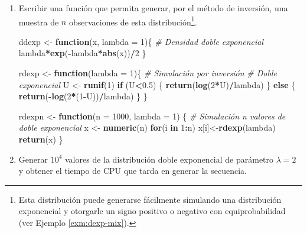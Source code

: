 \documentclass[
]{book}
\newenvironment{Shaded}{\begin{snugshade}}{\end{snugshade}}
\newcommand{\CommentTok}[1]{\textcolor[rgb]{0.56,0.35,0.01}{\textit{#1}}}
\newcommand{\ControlFlowTok}[1]{\textcolor[rgb]{0.13,0.29,0.53}{\textbf{#1}}}
\newcommand{\DataTypeTok}[1]{\textcolor[rgb]{0.13,0.29,0.53}{#1}}
\newcommand{\DecValTok}[1]{\textcolor[rgb]{0.00,0.00,0.81}{#1}}
\newcommand{\FloatTok}[1]{\textcolor[rgb]{0.00,0.00,0.81}{#1}}
\newcommand{\KeywordTok}[1]{\textcolor[rgb]{0.13,0.29,0.53}{\textbf{#1}}}
\newcommand{\NormalTok}[1]{#1}
\newcommand{\OperatorTok}[1]{\textcolor[rgb]{0.81,0.36,0.00}{\textbf{#1}}}
\newcommand{\StringTok}[1]{\textcolor[rgb]{0.31,0.60,0.02}{#1}}
\theoremstyle{break}
\theoremstyle{definition}
\theoremstyle{definition}
\theoremstyle{definition}
\theoremstyle{remark}
\begin{document}
\begin{enumerate}
\def\labelenumi{\alph{enumi})}
\item
  Escribir una función que permita generar, por el método de
  inversión, una muestra de \(n\) observaciones de esta distribución\footnote{Esta distribución puede generarse fácilmente simulando una distribución exponencial y otorgarle un signo positivo o negativo con equiprobabilidad (ver Ejemplo \ref{exm:dexp-mix}).}.

\begin{Shaded}
\begin{Highlighting}[]
\NormalTok{ddexp <-}\StringTok{ }\ControlFlowTok{function}\NormalTok{(x, }\DataTypeTok{lambda =} \DecValTok{1}\NormalTok{)\{}
\CommentTok{# Densidad doble exponencial}
\NormalTok{  lambda}\OperatorTok{*}\KeywordTok{exp}\NormalTok{(}\OperatorTok{-}\NormalTok{lambda}\OperatorTok{*}\KeywordTok{abs}\NormalTok{(x))}\OperatorTok{/}\DecValTok{2}
\NormalTok{\}}

\NormalTok{rdexp <-}\StringTok{ }\ControlFlowTok{function}\NormalTok{(}\DataTypeTok{lambda =} \DecValTok{1}\NormalTok{)\{}
\CommentTok{# Simulación por inversión}
\CommentTok{# Doble exponencial}
\NormalTok{  U <-}\StringTok{ }\KeywordTok{runif}\NormalTok{(}\DecValTok{1}\NormalTok{)}
  \ControlFlowTok{if}\NormalTok{ (U}\OperatorTok{<}\FloatTok{0.5}\NormalTok{) \{}
    \KeywordTok{return}\NormalTok{(}\KeywordTok{log}\NormalTok{(}\DecValTok{2}\OperatorTok{*}\NormalTok{U)}\OperatorTok{/}\NormalTok{lambda)}
\NormalTok{  \} }\ControlFlowTok{else}\NormalTok{ \{}
    \KeywordTok{return}\NormalTok{(}\OperatorTok{-}\KeywordTok{log}\NormalTok{(}\DecValTok{2}\OperatorTok{*}\NormalTok{(}\DecValTok{1}\OperatorTok{-}\NormalTok{U))}\OperatorTok{/}\NormalTok{lambda)}
\NormalTok{  \}}
\NormalTok{\}}

\NormalTok{rdexpn <-}\StringTok{ }\ControlFlowTok{function}\NormalTok{(}\DataTypeTok{n =} \DecValTok{1000}\NormalTok{, }\DataTypeTok{lambda =} \DecValTok{1}\NormalTok{) \{}
\CommentTok{# Simulación n valores de doble exponencial}
\NormalTok{    x <-}\StringTok{ }\KeywordTok{numeric}\NormalTok{(n)}
    \ControlFlowTok{for}\NormalTok{(i }\ControlFlowTok{in} \DecValTok{1}\OperatorTok{:}\NormalTok{n) x[i]<-}\KeywordTok{rdexp}\NormalTok{(lambda)}
    \KeywordTok{return}\NormalTok{(x)}
\NormalTok{\}}
\end{Highlighting}
\end{Shaded}
\item
  Generar \(10^{4}\) valores de la distribución doble exponencial de
  parámetro \(\lambda=2\) y obtener el tiempo de CPU que tarda en
  generar la secuencia.


\end{enumerate}
\end{document}
